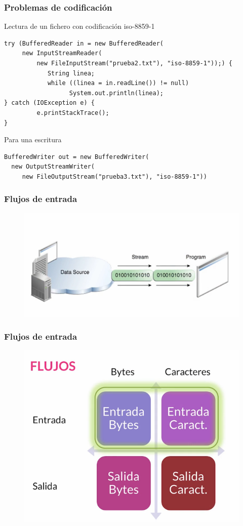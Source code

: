\documentclass{beamer}
\begin{document}
\begin{frame}[fragile]
\frametitle{Problemas de codificación}
Lectura de un fichero con codificación iso-8859-1
\begin{verbatim}
try (BufferedReader in = new BufferedReader(
     new InputStreamReader(
         new FileInputStream("prueba2.txt"), "iso-8859-1"));) {
            String linea;
            while ((linea = in.readLine()) != null)
                  System.out.println(linea);
} catch (IOException e) {
         e.printStackTrace();
}
\end{verbatim}
Para una escritura
\begin{verbatim}
BufferedWriter out = new BufferedWriter(
  new OutputStreamWriter(
     new FileOutputStream("prueba3.txt"), "iso-8859-1"))
\end{verbatim}
\end{frame}


\begin{frame}
\frametitle{Flujos de entrada}
\begin{figure}
\includegraphics[scale=0.6]{imagenes/flujoEntrada.png}
\end{figure}
\end{frame}

\begin{frame}
\frametitle{Flujos de entrada}
\begin{figure}
\includegraphics[scale=0.5]{imagenes/flujoEntrada1.png}
\end{figure}
\end{frame}
\end{document}
